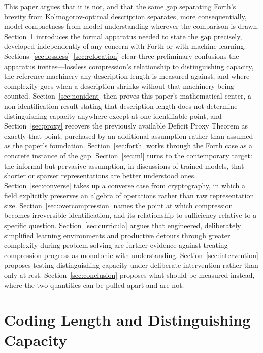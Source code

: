 \documentclass[11pt]{article}
\theoremstyle{plain}
\begin{document}
This paper argues that it is not, and that the same gap separating Forth's brevity from Kolmogorov-optimal description separates, more consequentially, model compactness from model understanding wherever the comparison is drawn. Section~\ref{sec:apparatus} introduces the formal apparatus needed to state the gap precisely, developed independently of any concern with Forth or with machine learning. Sections~\ref{sec:lossless}--\ref{sec:relocation} clear three preliminary confusions the apparatus invites---lossless compression's relationship to distinguishing capacity, the reference machinery any description length is measured against, and where complexity goes when a description shrinks without that machinery being counted. Section~\ref{sec:nonident} then proves this paper's mathematical center, a non-identification result stating that description length does not determine distinguishing capacity anywhere except at one identifiable point, and Section~\ref{sec:proxy} recovers the previously available Deficit Proxy Theorem as exactly that point, purchased by an additional assumption rather than assumed as the paper's foundation. Section~\ref{sec:forth} works through the Forth case as a concrete instance of the gap. Section~\ref{sec:ml} turns to the contemporary target: the informal but pervasive assumption, in discussions of trained models, that shorter or sparser representations are better understood ones. Section~\ref{sec:converse} takes up a converse case from cryptography, in which a field explicitly preserves an algebra of operations rather than raw representation size. Section~\ref{sec:overcompression} names the point at which compression becomes irreversible identification, and its relationship to sufficiency relative to a specific question. Section~\ref{sec:curricula} argues that engineered, deliberately simplified learning environments and productive detours through greater complexity during problem-solving are further evidence against treating compression progress as monotonic with understanding. Section~\ref{sec:intervention} proposes testing distinguishing capacity under deliberate intervention rather than only at rest. Section~\ref{sec:conclusion} proposes what should be measured instead, where the two quantities can be pulled apart and are not.

\section{Coding Length and Distinguishing Capacity}
\label{sec:apparatus}
\end{document}
